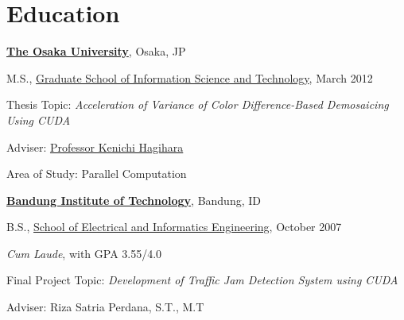 \section{Education}

\href{http://www.osaka-u.ac.jp/}{\textbf{The Osaka University}},
Osaka, JP
\begin{outerlist}


\item[] M.S.,
        \href{http://www.ist.osaka-u.ac.jp/}
             {Graduate School of Information Science and Technology}, March 2012
        \begin{innerlist}
        \item Thesis Topic: \emph{Acceleration of Variance of Color Difference-Based Demosaicing Using CUDA}
        \item Adviser:
              \href{http://www-hagi.ist.osaka-u.ac.jp/}
                   {Professor Kenichi Hagihara}
        \item Area of Study: Parallel Computation
        \end{innerlist}

\end{outerlist}

\halfblankline

\href{http://www.itb.ac.id/}{\textbf{Bandung Institute of Technology}},
Bandung, ID

\begin{outerlist}

\item[] B.S.,
        \href{http://stei.itb.ac.id/}
             {School of Electrical and Informatics Engineering}, October 2007
        \begin{innerlist}
        \item \emph{Cum Laude}, with GPA 3.55/4.0
        \item Final Project Topic: \emph{Development of Traffic Jam Detection System using CUDA}
        \item Adviser: Riza Satria Perdana, S.T., M.T
        \end{innerlist}

\end{outerlist}